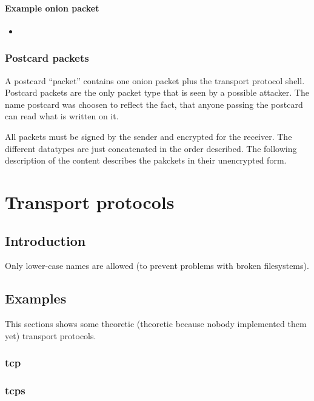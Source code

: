 \documentclass[12pt,a4paper]{book}
\begin{document}
{\subsubsection{Example onion packet}
\begin{itemize}
\item 
\end{itemize}
\subsection{Postcard packets}
A postcard "`packet"' contains one onion packet plus the transport protocol
shell.  Postcard packets are the only packet type that is seen by a possible
attacker.  The name postcard was choosen to reflect the fact, that anyone
passing the postcard can read what is written on it.

All packets must be signed by the sender and encrypted for the receiver.
The different datatypes are just concatenated in the order described.
The following description of the content describes the pakckets
in their unencrypted form.

\chapter{Transport protocols}
\section{Introduction}
Only lower-case names are allowed (to prevent problems with broken filesystems).
\section{Examples}
This sections shows some theoretic (theoretic because nobody implemented
them yet) transport protocols.
\subsection{tcp}
\subsection{tcps}
}
\end{document}
